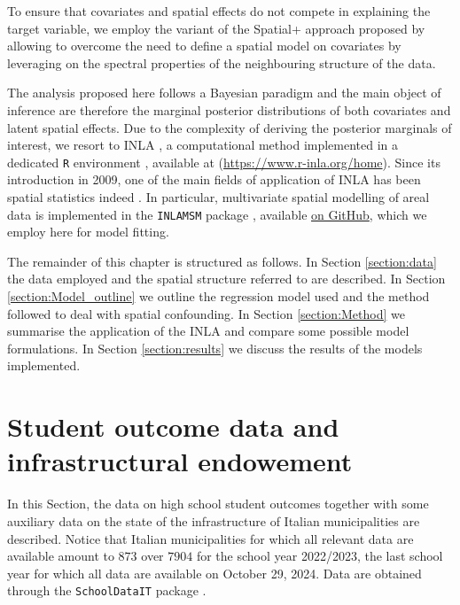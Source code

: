 \documentclass[openany]{book}
\begin{document}
To ensure that covariates and spatial effects do not compete in explaining the target variable, we employ the variant of the Spatial+ approach proposed by \citep{Urdangarin24} allowing to overcome the need to define a spatial model on covariates by leveraging on the spectral properties of the neighbouring structure of the data.

The analysis proposed here follows a Bayesian paradigm and the main object of inference are therefore the marginal posterior distributions of both covariates and latent spatial effects. Due to the complexity of deriving the posterior marginals of interest, we resort to INLA \citep[INLA hereinafter, ][]{INLA, VBINLA}, a computational method implemented in a dedicated \texttt{R} environment \citep[\texttt{R-INLA},][]{INLAbook, Wang}, available at (\url{https://www.r-inla.org/home}). Since its introduction in 2009, one of the main fields of application of INLA has been spatial statistics indeed \citep{INLArev, Blangiardo}. In particular, multivariate spatial modelling of areal data is implemented in the \texttt{INLAMSM} package \citep{INLAMSM, INLAMSM2}, available \href{https://github.com/becarioprecario/INLAMSM}{on GitHub}, which we employ here for model fitting.
 
The remainder of this chapter is structured as follows. In Section \ref{section:data} the data employed and the spatial structure referred to are described. In Section \ref{section:Model_outline} we outline the regression model used and the method followed to deal with spatial confounding. In Section \ref{section:Method} we summarise the application of the INLA and compare some possible model formulations. In Section \ref{section:results} we discuss the results of the models implemented.



\section{Student outcome data and infrastructural endowement} \label{section:Invalsi:data}
In this Section, the data on high school student outcomes together with some auxiliary data on the state of the infrastructure of Italian municipalities are described. 
Notice that Italian municipalities for which all relevant data are available amount to $873$ over $7904$ for the school year 2022/2023, the last school year for which all data are available on October 29, 2024. Data are obtained through the \texttt{SchoolDataIT} package \cite{SchoolDataIT}. 
 
\end{document}
